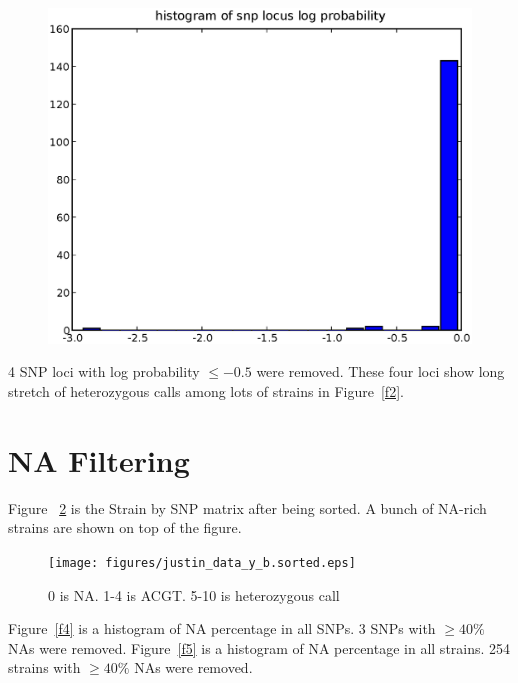 \documentclass[a4paper,10pt]{article}
\begin{document}
\begin{figure}
\includegraphics[width=1\textwidth]{figures/justin_data_y_SNP_locus_log_prob.eps}
\caption{}\label{f3}
\end{figure}

4 SNP loci with log probability $\leq -0.5$ were removed. These four loci show long stretch of heterozygous calls among lots of strains in Figure~\ref{f2}.

\section{NA Filtering}
Figure ~\ref{f10} is the Strain by SNP matrix after being sorted. A bunch of NA-rich strains are shown on top of the figure.

\begin{figure}
\texttt{[image: figures/justin\_data\_y\_b.sorted.eps]}
\caption{0 is NA. 1-4 is ACGT. 5-10 is heterozygous call}\label{f10}
\end{figure}


Figure~\ref{f4} is a histogram of NA percentage in all SNPs. 3 SNPs with $\geq 40\%$ NAs were removed. Figure~\ref{f5} is a histogram of NA percentage in all strains. 254 strains with $\geq 40\%$ NAs were removed.
\end{document}
